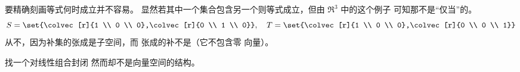 \begin{answer}
\begin{exparts}
           要精确刻画等式何时成立并不容易。
           显然若其中一个集合包含另一个则等式成立，但由 \( \Re^3 \) 中的这个例子
           可知那不是“仅当”的。
           \begin{equation*}
             S=\set{\colvec[r]{1 \\ 0 \\ 0},\colvec[r]{0 \\ 1 \\ 0}},
             \quad
             T=\set{\colvec[r]{1 \\ 0 \\ 0},\colvec[r]{0 \\ 0 \\ 1}}
           \end{equation*}
         \partsitem 从不，因为补集的张成是子空间，而
           张成的补不是（它不包含零 
           向量）。
      \end{exparts}  
     \end{answer}
  \item 找一个对线性组合封闭 
    然而却不是向量空间的结构。
